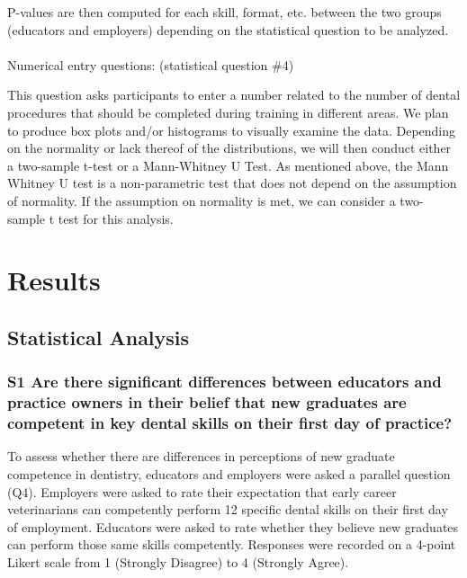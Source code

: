 \documentclass[
  11pt,
  letterpaper,
  DIV=11,
  numbers=noendperiod]{scrartcl}
\makeatletter
\let\oldparagraph\paragraph
\renewcommand{\paragraph}{
    \@ifstar
      \xxxParagraphStar
      \xxxParagraphNoStar
  }
\newcommand{\xxxParagraphStar}[1]{\oldparagraph*{#1}\mbox{}}
\newcommand{\xxxParagraphNoStar}[1]{\oldparagraph{#1}\mbox{}}
\numberwithin{figure}{section}
\makeatother
\begin{document}
P-values are then computed for each skill, format, etc. between the two
groups (educators and employers) depending on the statistical question
to be analyzed.

\paragraph{Numerical entry questions: (statistical question
\#4)}\label{numerical-entry-questions-statistical-question-4}

This question asks participants to enter a number related to the number
of dental procedures that should be completed during training in
different areas. We plan to produce box plots and/or histograms to
visually examine the data. Depending on the normality or lack thereof of
the distributions, we will then conduct either a two-sample t-test or a
Mann-Whitney U Test. As mentioned above, the Mann Whitney U test is a
non-parametric test that does not depend on the assumption of normality.
If the assumption on normality is met, we can consider a two-sample t
test for this analysis.

\section{Results}\label{results}

\subsection{Statistical Analysis}\label{statistical-analysis}

\subsubsection{S1 Are there significant differences between educators
and practice owners in their belief that new graduates are competent in
key dental skills on their first day of
practice?}\label{s1-are-there-significant-differences-between-educators-and-practice-owners-in-their-belief-that-new-graduates-are-competent-in-key-dental-skills-on-their-first-day-of-practice}

To assess whether there are differences in perceptions of new graduate
competence in dentistry, educators and employers were asked a parallel
question (Q4). Employers were asked to rate their expectation that early
career veterinarians can competently perform 12 specific dental skills
on their first day of employment. Educators were asked to rate whether
they believe new graduates can perform those same skills competently.
Responses were recorded on a 4-point Likert scale from 1 (Strongly
Disagree) to 4 (Strongly Agree).
\end{document}
